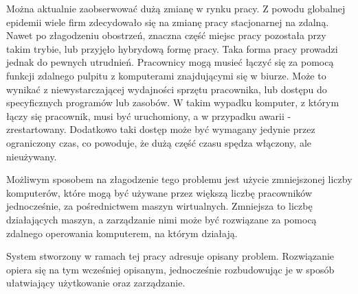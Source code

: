 \documentclass[../wstep.tex]{subfiles}
\begin{document}
Można aktualnie zaobserwować dużą zmianę w rynku pracy. Z powodu globalnej epidemii wiele firm zdecydowało się na zmianę pracy stacjonarnej na zdalną. Nawet po złagodzeniu obostrzeń, znaczna część miejsc pracy pozostała przy takim trybie, lub przyjęło hybrydową formę pracy. Taka forma pracy prowadzi jednak do pewnych utrudnień. Pracownicy mogą musieć łączyć się za pomocą funkcji zdalnego pulpitu z komputerami znajdującymi się w biurze. Może to wynikać z niewystarczającej wydajności sprzętu pracownika, lub dostępu do specyficznych programów lub zasobów. W takim wypadku komputer, z którym łączy się pracownik, musi być uruchomiony, a w przypadku awarii - zrestartowany. Dodatkowo taki dostęp może być wymagany jedynie przez ograniczony czas, co powoduje, że dużą część czasu spędza włączony, ale nieużywany.

Możliwym sposobem na złagodzenie tego problemu jest użycie zmniejszonej liczby komputerów, które mogą być używane przez większą liczbę pracowników jednocześnie, za pośrednictwem maszyn wirtualnych. Zmniejsza to liczbę działających maszyn, a zarządzanie nimi może być rozwiązane za pomocą zdalnego operowania komputerem, na którym działają.

System stworzony w ramach tej pracy adresuje opisany problem. Rozwiązanie opiera się na tym wcześniej opisanym, jednocześnie rozbudowując je w sposób ułatwiający użytkowanie oraz zarządzanie.
\end{document}
